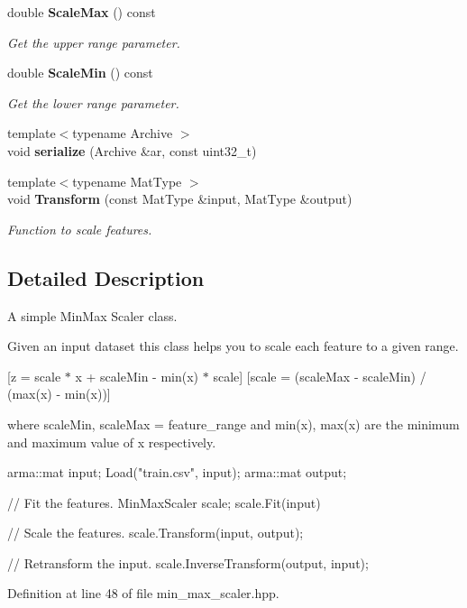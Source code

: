 \begin{DoxyCompactItemize}
double \textbf{ Scale\+Max} () const
\begin{DoxyCompactList}\small\item\em Get the upper range parameter. \end{DoxyCompactList}\item 
double \textbf{ Scale\+Min} () const
\begin{DoxyCompactList}\small\item\em Get the lower range parameter. \end{DoxyCompactList}\item 
{\footnotesize template$<$typename Archive $>$ }\\void \textbf{ serialize} (Archive \&ar, const uint32\+\_\+t)
\item 
{\footnotesize template$<$typename Mat\+Type $>$ }\\void \textbf{ Transform} (const Mat\+Type \&input, Mat\+Type \&output)
\begin{DoxyCompactList}\small\item\em Function to scale features. \end{DoxyCompactList}\end{DoxyCompactItemize}


\subsection{Detailed Description}
A simple Min\+Max Scaler class. 

Given an input dataset this class helps you to scale each feature to a given range.

[z = scale $\ast$ x + scale\+Min -\/ min(x) $\ast$ scale] [scale = (scale\+Max -\/ scale\+Min) / (max(x) -\/ min(x))]

where scale\+Min, scale\+Max = feature\+\_\+range and min(x), max(x) are the minimum and maximum value of x respectively.


\begin{DoxyCode}
arma::mat input;
Load(\textcolor{stringliteral}{"train.csv"}, input);
arma::mat output;

\textcolor{comment}{// Fit the features.}
MinMaxScaler scale;
scale.Fit(input)

\textcolor{comment}{// Scale the features.}
scale.Transform(input, output);

\textcolor{comment}{// Retransform the input.}
scale.InverseTransform(output, input);
\end{DoxyCode}
 

Definition at line 48 of file min\+\_\+max\+\_\+scaler.\+hpp.



